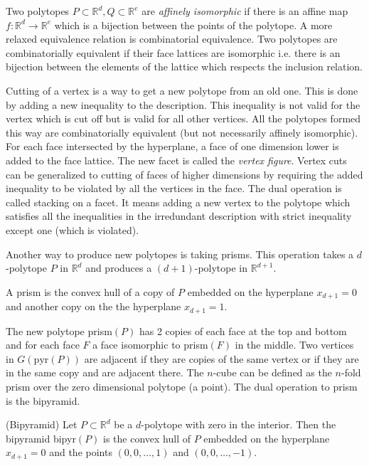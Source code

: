 Two polytopes $P\subset \mathbb{R}^d, Q \subset \mathbb{R}^e$ are 
\textit{affinely isomorphic} if there is an affine map $f: \mathbb{R}^d 
\rightarrow \mathbb{R}^e$ which is a bijection between the points of the 
polytope. A more relaxed equivalence relation is combinatorial equivalence. Two 
polytopes are combinatorially equivalent if their face lattices are isomorphic 
i.e. there is an bijection between the elements of the lattice which respects 
the inclusion relation. 

Cutting of a vertex is a way to get a new polytope from an old one. This is 
done by adding a new inequality to the description. This inequality is not 
valid for the vertex which is cut off but is valid for all other vertices. All 
the polytopes formed this way are combinatorially equivalent (but not 
necessarily affinely isomorphic). For each face intersected by the hyperplane, 
a face of one dimension lower is added to the face lattice. The new facet is 
called the \textit{vertex figure}. Vertex cuts can be generalized to cutting of 
faces of higher dimensions by requiring the added inequality to be violated by 
all the vertices in the face. The dual operation is called stacking on a facet. 
It means adding a new vertex to the polytope which satisfies all the 
inequalities in the irredundant description with strict inequality except one 
(which is violated).

Another way to produce new polytopes is taking prisms. This operation takes a 
$d$-polytope $P$ in $\mathbb{R}^d$ and produces a $(d+1)$-polytope in 
$\mathbb{R}^{d+1}$. 
\begin{definition}
 A prism is the convex hull of a copy of $P$ embedded on the hyperplane 
$x_{d+1} = 0$ and another copy on the the hyperplane $x_{d+1} = 1$.
\end{definition}

 The new polytope prism$(P)$ has 2 copies of 
each face at the top and bottom and for each face $F$ a face isomorphic to 
prism$(F)$ in the middle. Two vertices in $G(\text{pyr}(P))$ are adjacent if 
they are copies of the same vertex or if they are in the same copy and are 
adjacent there. 
The $n$-cube can be defined as the $n$-fold 
prism over the zero dimensional polytope (a point). The dual operation to prism 
is the bipyramid. 
\begin{definition}
 (Bipyramid) Let $P\subset \mathbb{R}^d$ be a $d$-polytope with zero in the 
interior. Then the bipyramid bipyr$(P)$ is the convex hull of $P$ embedded on 
the hyperplane $x_{d+1} = 0$ and the points $(0,0,\dots, 1)$ and $(0,0,\dots, 
-1)$.
\end{definition}


